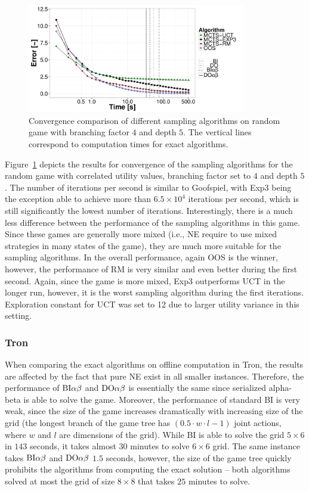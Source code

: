 \begin{figure}
\centering
\includegraphics[width=0.85\textwidth]{figures/convergence-rg-fix.pdf}
\caption{Convergence comparison of different sampling algorithms on random game with branching factor $4$ and depth $5$. The vertical lines correspond to computation times for exact algorithms.} \label{fig:off:conv:rg}
\end{figure}

Figure~\ref{fig:off:conv:rg} depicts the results for convergence of the sampling algorithms for the random game with correlated utility values, branching factor set to $4$ and depth $5$. The number of iterations per second is similar to Goofspiel, with Exp3 being the exception able to achieve more than $6.5\times10^4$ iterations per second, which is still significantly the lowest number of iterations.
Interestingly, there is a much less difference between the performance of the sampling algorithms in this game. Since these games are generally more mixed (i.e., NE require to use mixed strategies in many states of the game), they are much more suitable for the sampling algorithms. In the overall performance, again OOS is the winner, however, the performance of RM is very similar and even better during the first second. Again, since the game is more mixed, Exp3 outperforms UCT in the longer run, however, it is the worst sampling algorithm during the first iterations. Exploration constant for UCT was set to 12 due to larger utility variance in this setting.

\subsubsection{Tron}

When comparing the exact algorithms on offline computation in Tron, the results are affected by the fact that pure NE exist in all smaller instances.
Therefore, the performance of $\textrm{BI}\alpha\beta$ and $\textrm{DO}\alpha\beta$ is essentially the same since serialized alpha-beta is able to solve the game. Moreover, the performance of standard BI is very weak, since the size of the game increases dramatically with increasing size of the grid (the longest branch of the game tree has $\left(0.5\cdot w\cdot l - 1\right)$ joint actions, where $w$ and $l$ are dimensions of the grid). While BI is able to solve the grid $5\times6$ in $143$ seconds, it takes almost $30$ minutes to solve $6\times6$ grid. The same instance takes $\textrm{BI}\alpha\beta$ and $\textrm{DO}\alpha\beta$ $1.5$ seconds, however, the size of the game tree quickly prohibits the algorithms from computing the exact solution -- both algorithms solved at most the grid of size $8\times8$ that takes $25$ minutes to solve. 

